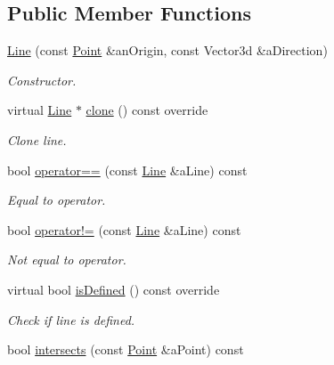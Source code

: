 \subsection*{Public Member Functions}
\begin{DoxyCompactItemize}
\item 
\hyperlink{classostk_1_1math_1_1geom_1_1d3_1_1objects_1_1_line_a9ebdaaf67a4bd91780808f8683463ebe}{Line} (const \hyperlink{classostk_1_1math_1_1geom_1_1d3_1_1objects_1_1_point}{Point} \&an\+Origin, const Vector3d \&a\+Direction)
\begin{DoxyCompactList}\small\item\em Constructor. \end{DoxyCompactList}\item 
virtual \hyperlink{classostk_1_1math_1_1geom_1_1d3_1_1objects_1_1_line}{Line} $\ast$ \hyperlink{classostk_1_1math_1_1geom_1_1d3_1_1objects_1_1_line_aaf6fc08cf6b690b88c52d112052ce226}{clone} () const override
\begin{DoxyCompactList}\small\item\em Clone line. \end{DoxyCompactList}\item 
bool \hyperlink{classostk_1_1math_1_1geom_1_1d3_1_1objects_1_1_line_a60d23a12b6f81685f430c0fd8ff07752}{operator==} (const \hyperlink{classostk_1_1math_1_1geom_1_1d3_1_1objects_1_1_line}{Line} \&a\+Line) const
\begin{DoxyCompactList}\small\item\em Equal to operator. \end{DoxyCompactList}\item 
bool \hyperlink{classostk_1_1math_1_1geom_1_1d3_1_1objects_1_1_line_ae2dad60d3d1b08f5d17a2d87839d0830}{operator!=} (const \hyperlink{classostk_1_1math_1_1geom_1_1d3_1_1objects_1_1_line}{Line} \&a\+Line) const
\begin{DoxyCompactList}\small\item\em Not equal to operator. \end{DoxyCompactList}\item 
virtual bool \hyperlink{classostk_1_1math_1_1geom_1_1d3_1_1objects_1_1_line_a092640b8e18d71c734185f326698f518}{is\+Defined} () const override
\begin{DoxyCompactList}\small\item\em Check if line is defined. \end{DoxyCompactList}\item 
bool \hyperlink{classostk_1_1math_1_1geom_1_1d3_1_1objects_1_1_line_a65d3865e67da2d1629fa1e302a2c62fe}{intersects} (const \hyperlink{classostk_1_1math_1_1geom_1_1d3_1_1objects_1_1_point}{Point} \&a\+Point) const

\end{DoxyCompactItemize}
